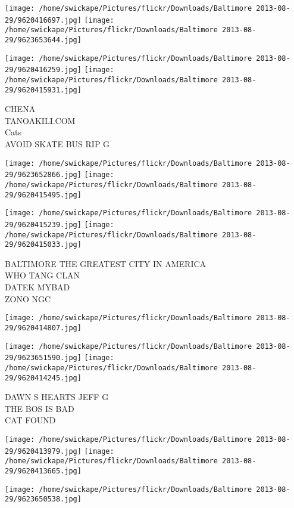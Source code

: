 \documentclass[10pt,letterpaper]{article}
\begin{document}
\texttt{[image: /home/swickape/Pictures/flickr/Downloads/Baltimore 2013-08-29/9620416697.jpg]}
\texttt{[image: /home/swickape/Pictures/flickr/Downloads/Baltimore 2013-08-29/9623653644.jpg]}

\texttt{[image: /home/swickape/Pictures/flickr/Downloads/Baltimore 2013-08-29/9620416259.jpg]}
\texttt{[image: /home/swickape/Pictures/flickr/Downloads/Baltimore 2013-08-29/9620415931.jpg]}

CHENA\\
TANOAKILI.COM\\
Cats\\
AVOID SKATE BUS RIP G\\
\pagebreak

\texttt{[image: /home/swickape/Pictures/flickr/Downloads/Baltimore 2013-08-29/9623652866.jpg]}
\texttt{[image: /home/swickape/Pictures/flickr/Downloads/Baltimore 2013-08-29/9620415495.jpg]}

\texttt{[image: /home/swickape/Pictures/flickr/Downloads/Baltimore 2013-08-29/9620415239.jpg]}
\texttt{[image: /home/swickape/Pictures/flickr/Downloads/Baltimore 2013-08-29/9620415033.jpg]}

BALTIMORE THE GREATEST CITY IN AMERICA\\
WHO TANG CLAN\\
DATEK MYBAD\\
ZONO NGC\\
\pagebreak

\texttt{[image: /home/swickape/Pictures/flickr/Downloads/Baltimore 2013-08-29/9620414807.jpg]}

\vspace{0.25in}
\texttt{[image: /home/swickape/Pictures/flickr/Downloads/Baltimore 2013-08-29/9623651590.jpg]}
\texttt{[image: /home/swickape/Pictures/flickr/Downloads/Baltimore 2013-08-29/9620414245.jpg]}

DAWN S HEARTS JEFF G\\
THE BOS IS BAD\\
CAT FOUND\\
\pagebreak

\texttt{[image: /home/swickape/Pictures/flickr/Downloads/Baltimore 2013-08-29/9620413979.jpg]}
\texttt{[image: /home/swickape/Pictures/flickr/Downloads/Baltimore 2013-08-29/9620413665.jpg]}

\vspace{0.25in}
\texttt{[image: /home/swickape/Pictures/flickr/Downloads/Baltimore 2013-08-29/9623650538.jpg]}
\end{document}
